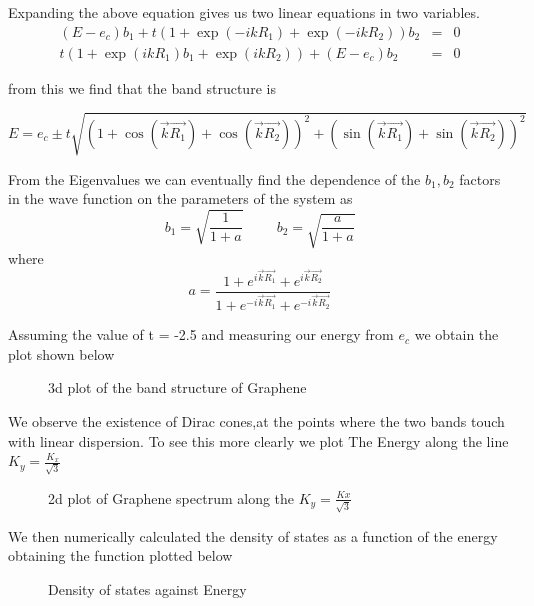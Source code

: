 \documentclass[a4paper]{article}
\begin{document}
Expanding the above equation gives us two linear equations in two variables. 
\begin{eqnarray}
(E-e_{c})b_1  +  t(1 + \exp(-ikR_{1}) + \exp(-ikR_{2}))b_2 & = & 0\\
 t(1 + \exp(ikR_{1})b_1  +     \exp(ikR_{2})) + (E-e_{c})b_2 & = &  0
\end{eqnarray}

from this we find that the band structure is

\begin{equation}
E = e_c \pm t\sqrt{(1 + \cos(\vec{k}\vec{R_{1}}) + \cos(\vec{k}\vec{R_{2}}) )^2  + ( \sin(\vec{k}\vec{R_{1}}) + \sin(\vec{k}\vec{R_{2}}) )^2  }
\end{equation}

From the Eigenvalues we can eventually find the dependence of the $b_1,b_2$ factors in the wave function on the parameters of the system as 
\begin{equation}
b_1 = \sqrt{\frac{1}{1+a}}
\hspace{1cm}
b_2 = \sqrt{\frac{a}{1+a}}
\end{equation}
where
\begin{equation*}
a = \frac{1 + e^{i\vec{k}\vec{R_{1}}} + e^{i\vec{k}\vec{R_{2}}}}{1 + e^{-i\vec{k}\vec{R_{1}}} + e^{-i\vec{k}\vec{R_{2}}}}
\end{equation*}

Assuming the value of t = -2.5 and measuring our energy from $e_{c}$
we obtain the plot shown below
\begin{figure}[h]

\centering
\caption{\label{fig:frog}3d plot of the band structure of Graphene}
\end{figure}
\clearpage
We observe the existence of Dirac cones,at the points where the two bands touch with linear dispersion. To see this more clearly we plot The Energy along the line $K_{y} = \frac{K_{x}}{\sqrt{3}}$

\begin{figure}[h]
\centering
\caption{\label{fig:frog}2d plot of Graphene spectrum along the $K_{y}=\frac{K{x}}{\sqrt{3}}$ }
\end{figure}

We then numerically calculated the density of states as a function of the energy obtaining the function plotted below
\begin{figure}[h!]
\centering
\caption{\label{fig:frog}Density of states against Energy}
\end{figure}
\end{document}
